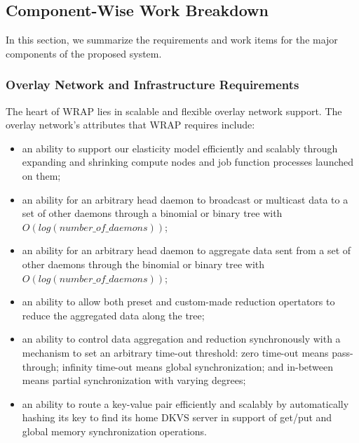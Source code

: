 \subsection{Component-Wise Work Breakdown}
In this section, we summarize the requirements and work items for
the major components of the proposed system.

\subsubsection{Overlay Network and Infrastructure Requirements}
The heart of WRAP lies in scalable and flexible overlay network support.
The overlay network's attributes that WRAP requires include:

\begin{itemize}

\item{an ability to support our elasticity model
efficiently and scalably through expanding and shrinking
compute nodes and job function processes launched on them;}

\item{an ability for an arbitrary head daemon to broadcast
or multicast data to a set of other daemons through a binomial
or binary tree with $O(log(number\_of\_daemons))$;}

\item{an ability for an arbitrary head daemon to aggregate data
sent from a set of other daemons through the binomial
or binary tree with $O(log(number\_of\_daemons))$;}

\item{an ability to allow both preset and custom-made reduction
opertators to reduce the aggregated data along the tree;}

\item{an ability to control data aggregation and reduction synchronously
with a mechanism to set an arbitrary time-out threshold: zero time-out means pass-through;
infinity time-out means global synchronization; and
in-between means partial synchronization with varying degrees;}

\item{an ability to route a key-value pair efficiently and
scalably by automatically hashing its key to find its home DKVS server
in support of get/put and global memory synchronization operations.}

\end{itemize}

